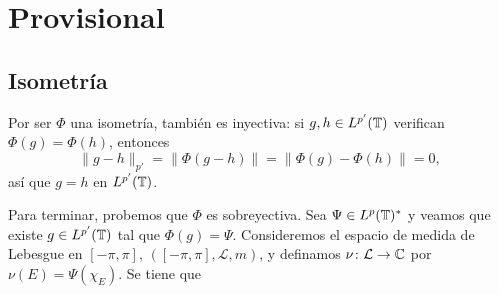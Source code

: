\documentclass[a4paper, 12pt, oneside]{book}
\begin{document}
\chapter{Provisional}

\section{Isometría}

Por ser $\Phi$ una isometría, también es inyectiva: si $g,h\in L^{p'}(\mathbb T)$ verifican $\Phi(g) = \Phi(h)$, entonces
\[\|g-h\|_{p'} = \|\Phi(g-h)\| = \|\Phi(g)-\Phi(h)\| = 0,\]
así que $g = h$ en $L^{p'}(\mathbb T)$.

Para terminar, probemos que $\Phi$ es sobreyectiva. Sea $\Psi \in L^p(\mathbb T)^*$ y veamos que existe $g \in L^{p'}(\mathbb T)$ tal que $\Phi(g) = \Psi$. Consideremos el espacio de medida de Lebesgue en $[-\pi,\pi]$, $([-\pi,\pi],\mathcal{L},m)$, y definamos $\nu \colon \mathcal{L} \to \mathbb C$ por $\nu(E) = \Psi(\chi_E)$. Se tiene que
\end{document}
